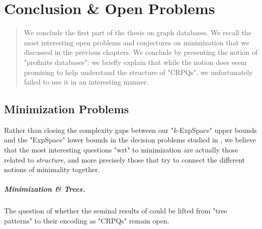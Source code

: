 \chapter[Conclusion \&~Open Problems]{Conclusion \& Open Problems}
\label{ch:conclu-database}
\renewcommand\thefigure{\thechapter.\arabic{figure}}

\begin{chapterpresentation}
	\begin{abstract}
		We conclude the first part of the thesis on graph databases.
		We recall the most interesting open problems and conjectures
		on minimization that we discussed in the previous chapters.
		We conclude by presenting the notion of "profinite databases":
		we briefly explain that while the notion does seem promising 
		to help understand the structure of "CRPQs", we unfortunately
		failed to use it in an interesting manner.
	\end{abstract}
		
	\par\bigskip\bigskip
	\chaptertoc
\end{chapterpresentation}

\section{Minimization Problems}

Rather than closing the complexity gaps between our "$k$-ExpSpace" upper bounds
and the "ExpSpace" lower bounds in the decision problems
studied in ,
we believe that the most interesting questions "wrt" to minimization
are actually those related to \emph{structure}, and more precisely those that try to
connect the different notions of minimality together.

\conjAtomVariableMinimal*

\paragraph*{Minimization \& Trees.}
The question of whether the seminal results of \cite{CzerwinskiMartensNiewerthParys2018Minimization} could be lifted from "tree patterns"
to their encoding as "CRPQs" remain open.
\conjTreePatternsAsCRPQs*


